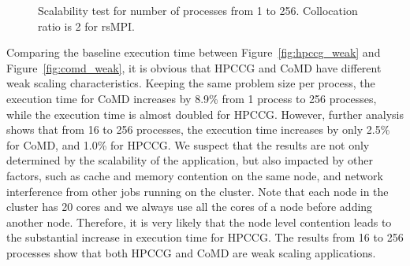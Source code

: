 \begin{figure}[!t]
	\begin{center}
	\end{center}
	\caption{Scalability test for number of processes from 1 to 256. Collocation ratio is 2 for rsMPI.}
	\label{fig:scalability}
    \vspace{-0.1in}
\end{figure}

Comparing the baseline execution time between Figure~\ref{fig:hpccg_weak} and Figure~\ref{fig:comd_weak}, it is obvious that HPCCG and CoMD have different weak scaling characteristics. Keeping the same problem size per process, the execution time for CoMD increases by 8.9\% from 1 process to 256 processes, while the execution time is almost doubled for HPCCG. However, further analysis shows that from 16 to 256 processes, the execution time increases by only 2.5\% for CoMD, and 1.0\% for HPCCG. We suspect that the results are not only determined by the scalability of the application, but also impacted by other factors, such as cache and memory contention on the same node, and network interference from other jobs running on the cluster. Note that each node in the cluster has 20 cores and we always use all the cores of a node before adding another node. Therefore, it is very likely that the node level contention leads to the substantial increase in execution time for HPCCG. The results from 16 to 256 processes show that both HPCCG and CoMD are weak scaling applications. 

